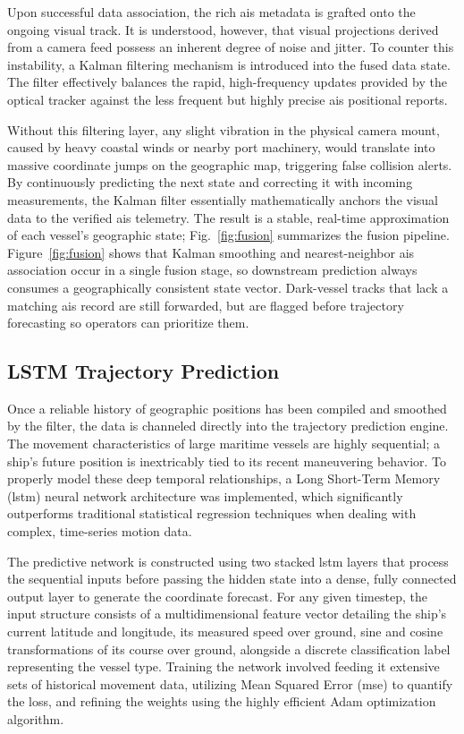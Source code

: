 Upon successful data association, the rich \gls{ais} metadata is grafted onto the ongoing visual track. It is understood, however, that visual projections derived from a camera feed possess an inherent degree of noise and jitter. To counter this instability, a Kalman filtering mechanism is introduced into the fused data state. The filter effectively balances the rapid, high-frequency updates provided by the optical tracker against the less frequent but highly precise \gls{ais} positional reports. 
\begin{reportfigblock}
Without this filtering layer, any slight vibration in the physical camera mount, caused by heavy coastal winds or nearby port machinery, would translate into massive coordinate jumps on the geographic map, triggering false collision alerts. By continuously predicting the next state and correcting it with incoming measurements, the Kalman filter essentially mathematically anchors the visual data to the verified \gls{ais} telemetry. The result is a stable, real-time approximation of each vessel's geographic state; Fig.~\ref{fig:fusion} summarizes the fusion pipeline.
Figure~\ref{fig:fusion} shows that Kalman smoothing and nearest-neighbor \gls{ais} association occur in a single fusion stage, so downstream prediction always consumes a geographically consistent state vector. Dark-vessel tracks that lack a matching \gls{ais} record are still forwarded, but are flagged before trajectory forecasting so operators can prioritize them.
\end{reportfigblock}

\subsection{LSTM Trajectory Prediction}

Once a reliable history of geographic positions has been compiled and smoothed by the filter, the data is channeled directly into the trajectory prediction engine. The movement characteristics of large maritime vessels are highly sequential; a ship's future position is inextricably tied to its recent maneuvering behavior. To properly model these deep temporal relationships, a Long Short-Term Memory (\gls{lstm}) neural network architecture was implemented, which significantly outperforms traditional statistical regression techniques when dealing with complex, time-series motion data.

The predictive network is constructed using two stacked \gls{lstm} layers that process the sequential inputs before passing the hidden state into a dense, fully connected output layer to generate the coordinate forecast. For any given timestep, the input structure consists of a multidimensional feature vector detailing the ship's current latitude and longitude, its measured speed over ground, sine and cosine transformations of its course over ground, alongside a discrete classification label representing the vessel type. Training the network involved feeding it extensive sets of historical movement data, utilizing Mean Squared Error (\gls{mse}) to quantify the loss, and refining the weights using the highly efficient Adam optimization algorithm.

